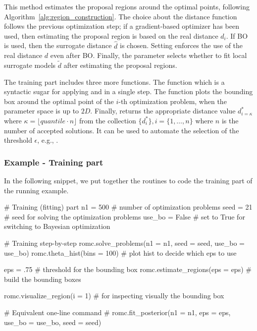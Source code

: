 \documentclass[article]{jss}
\begin{document}
\noindent
This method estimates the proposal regions around the optimal points,
following Algorithm~\ref{alg:region_construction}. The choice about
the distance function follows the previous optimization step; if a
gradient-based optimizer has been used, then estimating the proposal
region is based on the real distance \(d_i\). If BO is used, then the
surrogate distance \(\hat{d}\) is chosen. Setting
 enforces the use of the real distance \(d\)
even after BO. Finally, the parameter  selects
whether to fit local surrogate models \(\tilde{d}\) after estimating
the proposal regions.

\noindent
The training part includes three more functions. The function
 which is a syntactic sugar for
applying  and  in a
single step. The function  plots the
bounding box around the optimal point of the \(i\)-th optimization
problem, when the parameter space is up to \(2D\). Finally,
 returns the appropriate distance
value \(d_{i=\kappa}^*\) where
\(\kappa = \lfloor quantile \cdot n \rfloor\) from the collection
\(\{ d_i^* \}, i = \{1, \ldots, n\}\) where \(n\) is the number
of accepted solutions. It can be used to automate the selection of the
threshold \(\epsilon\), e.g.,
.


\subsubsection*{Example - Training part}


In the following snippet, we put together the routines to code the
training part of the running example.

\begin{Code}
# Training (fitting) part
n1 = 500 # number of optimization problems
seed = 21 # seed for solving the optimization problems
use_bo = False # set to True for switching to Bayesian optimization

# Training step-by-step
romc.solve_problems(n1 = n1, seed = seed, use_bo = use_bo)
romc.theta_hist(bins = 100) # plot hist to decide which eps to use

eps = .75 # threshold for the bounding box
romc.estimate_regions(eps = eps) # build the bounding boxes

romc.visualize_region(i = 1) # for inspecting visually the bounding box

# Equivalent one-line command
# romc.fit_posterior(n1 = n1, eps = eps, use_bo = use_bo, seed = seed)
\end{Code}
\end{document}
